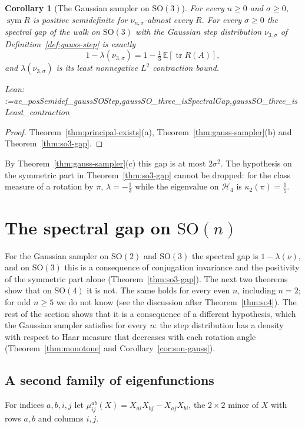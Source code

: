 \documentclass[11pt]{amsart}
\makeatletter
\newtheorem{corollary}[theorem]{Corollary}
\theoremstyle{definition}
\theoremstyle{remark}
\newcommand{\@leanlist}[1]{\def\@leansep{}\@for\@leanname:=#1\do{\@leansep
  \texttt{\expandafter\detokenize\expandafter{\@leanname}}\def\@leansep{, }}}
\newcommand{\lean}[1]{\par\smallskip\noindent
  {\footnotesize\normalfont\raggedright\textsf{Lean:} \@leanlist{#1}\par}}
\newcommand{\E}{\mathbb{E}}
\newcommand{\SO}{\mathrm{SO}}
\newcommand{\tr}{\operatorname{tr}}
\newcommand{\sym}{\operatorname{sym}}
\makeatother
\begin{document}
\begin{corollary}[The Gaussian sampler on $\SO(3)$]\label{cor:so3-gauss}
For every $n\ge0$ and $\sigma\ge0$, $\sym R$ is positive semidefinite for
$\nu_{n,\sigma}$-almost every $R$.  For every $\sigma\ge0$ the spectral gap of the walk on
$\SO(3)$ with the Gaussian step distribution $\nu_{3,\sigma}$ of Definition~\ref{def:gauss-step}
is exactly
\[
  1-\lambda(\nu_{3,\sigma})=1-\tfrac13\,\E[\tr R(A)],
\]
and $\lambda(\nu_{3,\sigma})$ is its least nonnegative $L^2$ contraction bound.
\lean{ae_posSemidef_gaussSOStep,gaussSO_three_isSpectralGap,gaussSO_three_isLeast_contraction}
\end{corollary}

\begin{proof}
Theorem~\ref{thm:principal-exists}(a), Theorem~\ref{thm:gauss-sampler}(b) and
Theorem~\ref{thm:so3-gap}.
\end{proof}

By Theorem~\ref{thm:gauss-sampler}(c) this gap is at most $2\sigma^2$.  The hypothesis on the
symmetric part in Theorem~\ref{thm:so3-gap} cannot be dropped: for the class measure of a
rotation by $\pi$, $\lambda=-\tfrac13$ while the eigenvalue on $\mathcal H_4$ is
$\kappa_2(\pi)=\tfrac15$.

\section{The spectral gap on \texorpdfstring{$\SO(n)$}{SO(n)}}\label{sec:son-gap}

For the Gaussian sampler on $\SO(2)$ and $\SO(3)$ the spectral gap is $1-\lambda(\nu)$, and on
$\SO(3)$ this is a consequence of conjugation invariance and the positivity of the symmetric
part alone (Theorem~\ref{thm:so3-gap}).  The next two theorems show that on $\SO(4)$ it is not.
The same holds for every even $n$, including $n=2$; for odd $n\ge5$ we do not know (see the
discussion after Theorem~\ref{thm:so4}).  The rest of the section shows that it is a consequence of a different
hypothesis, which the Gaussian sampler satisfies for every $n$: the step distribution has a
density with respect to Haar measure that decreases with each rotation angle
(Theorem~\ref{thm:monotone} and Corollary~\ref{cor:son-gauss}).

\subsection{A second family of eigenfunctions}
For indices $a,b,i,j$ let $\mu^{ab}_{ij}(X)=X_{ai}X_{bj}-X_{aj}X_{bi}$, the $2\times2$ minor of
$X$ with rows $a,b$ and columns $i,j$.
\end{document}
